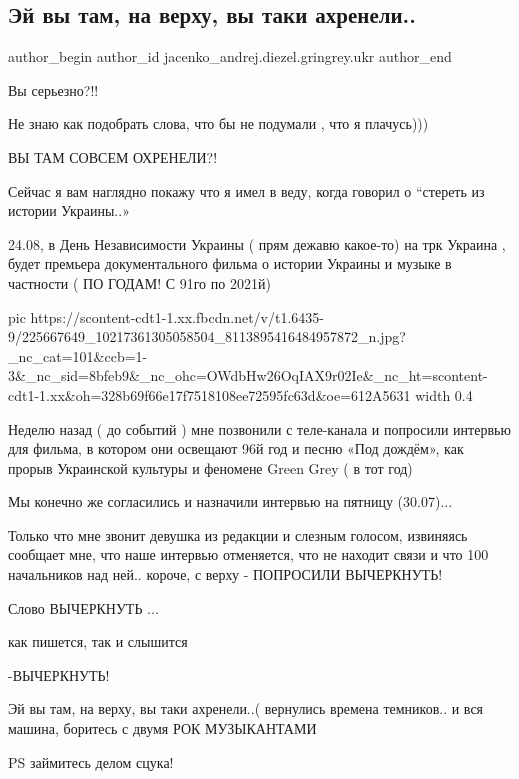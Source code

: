  
 
 
 
 
 
\subsection{Эй вы там, на верху, вы таки ахренели..}
\label{sec:30_07_2021.fb.jacenko_andrej.diezel.gringrey.ukr.2.ej_vy_tam_naverhu}
 
\ifcmt
 author_begin
   author_id jacenko_andrej.diezel.gringrey.ukr
 author_end
\fi

Вы серьезно?!!

Не знаю как подобрать слова, что бы не подумали , что я плачусь)))

ВЫ ТАМ СОВСЕМ ОХРЕНЕЛИ?!

Сейчас я вам наглядно покажу что я имел в веду, когда говорил о “стереть из
истории Украины..»

24.08, в День Независимости Украины ( прям дежавю какое-то) на трк Украина ,
будет премьера документального фильма о истории Украины и музыке в частности (
ПО ГОДАМ! С 91го  по 2021й)

\ifcmt
  pic https://scontent-cdt1-1.xx.fbcdn.net/v/t1.6435-9/225667649_10217361305058504_8113895416484957872_n.jpg?_nc_cat=101&ccb=1-3&_nc_sid=8bfeb9&_nc_ohc=OWdbHw26OqIAX9r02Ie&_nc_ht=scontent-cdt1-1.xx&oh=328b69f66e17f7518108ee72595fc63d&oe=612A5631
  width 0.4
\fi

Неделю назад ( до событий ) мне позвонили с теле-канала и попросили интервью
для фильма, в котором они освещают 96й год и песню «Под дождём», как прорыв
Украинской культуры и феномене Green Grey ( в тот год)

Мы конечно же согласились и назначили интервью на пятницу (30.07)...

Только что мне звонит девушка из редакции и слезным голосом, извиняясь сообщает
мне, что наше интервью отменяется, что не находит связи и что 100 начальников
над ней.. короче, с верху - ПОПРОСИЛИ ВЫЧЕРКНУТЬ!

Слово ВЫЧЕРКНУТЬ ...

как пишется, так и слышится 

-ВЫЧЕРКНУТЬ!

Эй вы там, на верху, вы таки ахренели..( вернулись времена темников.. и вся
машина, боритесь с двумя РОК МУЗЫКАНТАМИ

PS займитесь делом сцука!

